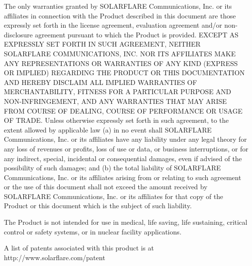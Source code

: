 The only warranties granted by SOLARFLARE Communications, Inc. or its 
affiliates in connection with the Product described in this document are 
those expressly set forth in the license agreement, evaluation agreement 
and/or non-disclosure agreement pursuant to which the Product is provided. 
EXCEPT AS EXPRESSLY SET FORTH IN SUCH AGREEMENT, NEITHER SOLARFLARE 
COMMUNICATIONS, INC. NOR ITS AFFILIATES MAKE ANY REPRESENTATIONS OR 
WARRANTIES OF ANY KIND (EXPRESS OR IMPLIED) REGARDING THE PRODUCT OR THIS 
DOCUMENTATION AND HEREBY DISCLAIM ALL IMPLIED WARRANTIES OF 
MERCHANTABILITY, FITNESS FOR A PARTICULAR PURPOSE AND NON-INFRINGEMENT, 
AND ANY WARRANTIES THAT MAY ARISE FROM COURSE OF DEALING, COURSE OF 
PERFORMANCE OR USAGE OF TRADE. Unless otherwise expressly set forth in 
such agreement, to the extent allowed by applicable law (a) in no event 
shall SOLARFLARE Communications, Inc. or its affiliates have any liability 
under any legal theory for any loss of revenues or profits, loss of use or 
data, or business interruptions, or for any indirect, special, incidental 
or consequential damages, even if advised of the possibility of such 
damages; and (b) the total liability of SOLARFLARE Communications, Inc. or 
its affiliates arising from or relating to such agreement or the use of 
this document shall not exceed the amount received by SOLARFLARE 
Communications, Inc. or its affiliates for that copy of the Product or 
this document which is the subject of such liability.

The Product is not intended for use in medical, life saving, life 
sustaining, critical control or safety systems, or in nuclear facility 
applications.

A list of patents associated with this product is at http://www.solarflare.com/patent